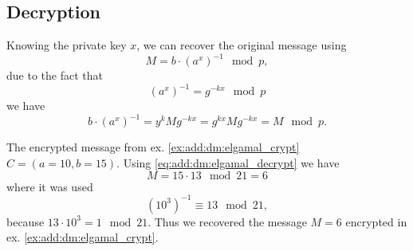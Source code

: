 \subsection{Decryption}
Knowing the private key $x$, we can recover the original message using
\begin{equation}
M = b\cdot \left(a^x\right)^{-1} \mod p,
\label{eq:add:dm:elgamal_decrypt}
\end{equation}
due to the fact that
\[
\left(a^x\right)^{-1} = g^{-kx} \mod p
\]
we have
\[
b\cdot \left(a^x\right)^{-1} = 
y^k M g^{-kx} = g^{kx} M g^{-kx} = M \mod p.
\]
\begin{example}
The encrypted message from ex. \ref{ex:add:dm:elgamal_crypt} 
$C = (a=10, b=15)$. Using \eqref{eq:add:dm:elgamal_decrypt} we have
\[
M = 15 \cdot 13 \mod 21 = 6
\]
where it was used
\[
\left(10^3\right)^{-1} \equiv 13 \mod 21,
\]
because $13 \cdot 10^3 = 1 \mod 21$.
Thus we recovered the message $M=6$ encrypted in
ex. \ref{ex:add:dm:elgamal_crypt}.
\label{ex:add:dm:elgamal_crypt}
\end{example}